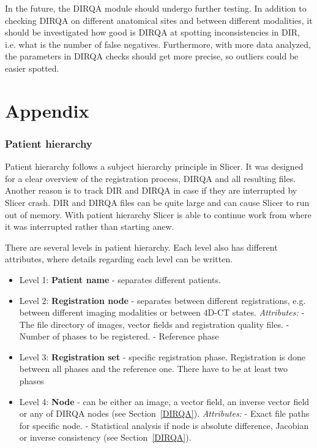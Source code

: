 \documentclass[type=dr, dr=rernat, accentcolor=tud7b,colorbacktitle, bigchapter, openright, twoside, 12pt ]{tudthesis}
\begin{document}
In the future, the DIRQA module should undergo further testing. In addition to checking DIRQA on different anatomical sites and between different modalities, 
it should be investigated how good is DIRQA at spotting inconsistencies in DIR, i.e. what is the number of false negatives. Furthermore, with more
data analyzed, the parameters in DIRQA checks should get more precise, so outliers could be easier spotted.

\newpage


\section{Appendix}
\label{RegHierarchy}
% 

\subsubsection{Patient hierarchy} 
\label{PatHierarchy}

Patient hierarchy follows a subject hierarchy principle in Slicer. It was designed for a clear overview of the registration process, DIRQA and all resulting files. Another reason is to track DIR
and DIRQA in case if they are interrupted by Slicer crash. DIR and DIRQA files can be quite large and can cause Slicer to run out of memory. With patient hierarchy Slicer is able to continue work
from where it was interrupted rather than starting anew.

There are several levels in patient hierarchy. Each level also has different attributes, where details regarding each level can be written.

\begin{itemize}
	\item Level 1: \textbf{Patient name} - separates different patients.
	\item Level 2: \textbf{Registration node} - separates between different registrations, e.g. between different imaging modalities or between 4D-CT states. 
	\subitem \textit{Attributes:}
	\subitem - The file directory of images, vector fields and registration quality files.
	\subitem - Number of phases to be registered.
	\subitem - Reference phase
	\item Level 3: \textbf{Registration set} - specific registration phase. Registration is done between all phases and the reference one. There have to be at least two phases
	\item Level 4: \textbf{Node} - can be either an image, a vector field, an inverse vector field or any of DIRQA nodes (see Section~\ref{DIRQA}).
	\subitem \textit{Attributes:}
	\subitem - Exact file paths for specific node.
	\subitem - Statistical analysis if node is absolute difference, Jacobian or inverse consistency (see Section~\ref{DIRQA}).
\end{itemize}
\end{document}
